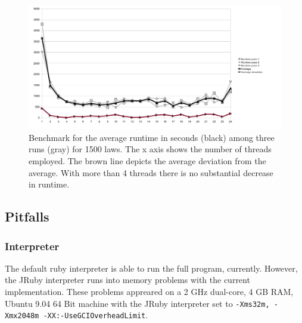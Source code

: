 \documentclass{scrartcl}
\begin{document}
\begin{figure}[ht]
\begin{center}
\includegraphics[width = \textwidth]{benchmark}
\caption{Benchmark for the average runtime in seconds (black) among three runs (gray) for 1500 laws. The x axis shows the number of threads employed. The brown line depicts the average deviation from the average. With more than 4 threads there is no substantial decrease in runtime.}
\label{fig:benchmark}
\end{center}
\end{figure}

\subsection{Pitfalls}
\subsubsection{Interpreter}
The default ruby interpreter is able to run the full program, currently. However, the JRuby interpreter runs into memory problems with the current implementation. These problems appreared on a 2 GHz dual-core, 4 GB RAM, Ubuntu 9.04 64 Bit machine with the JRuby interpreter set to \texttt{-Xms32m, -Xmx2048m -XX:-UseGCIOverheadLimit}.
\end{document}
